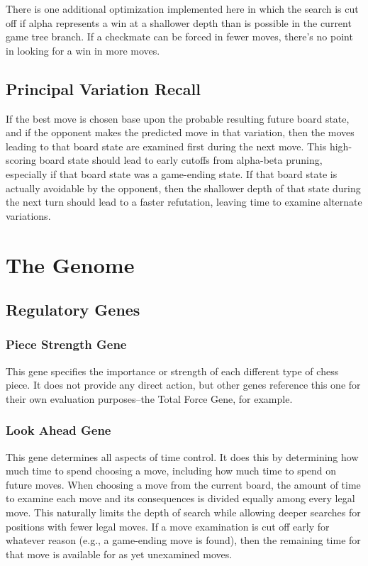 \documentclass[letter]{article}
\renewcommand\_{\textunderscore\allowbreak}
\begin{document}
There is one additional optimization implemented here in which the search is cut off if alpha represents a win at a shallower depth than is possible in the current game tree branch. If a checkmate can be forced in fewer moves, there's no point in looking for a win in more moves.

\subsection{Principal Variation Recall}

If the best move is chosen base upon the probable resulting future board state, and if the opponent makes the predicted move in that variation, then the moves leading to that board state are examined first during the next move. This high-scoring board state should lead to early cutoffs from alpha-beta pruning, especially if that board state was a game-ending state. If that board state is actually avoidable by the opponent, then the shallower depth of that state during the next turn should lead to a faster refutation, leaving time to examine alternate variations.


\section{The Genome}

\subsection{Regulatory Genes}
\subsubsection{Piece Strength Gene}
This gene specifies the importance or strength of each different type of chess piece. It does not provide any direct action, but other genes reference this one for their own evaluation purposes--the Total Force Gene, for example.

\subsubsection{Look Ahead Gene}
This gene determines all aspects of time control. It does this by determining how much time to spend choosing a move, including how much time to spend on future moves. When choosing a move from the current board, the amount of time to examine each move and its consequences is divided equally among every legal move. This naturally limits the depth of search while allowing deeper searches for positions with fewer legal moves. If a move examination is cut off early for whatever reason (e.g., a game-ending move is found), then the remaining time for that move is available for as yet unexamined moves.
\end{document}
